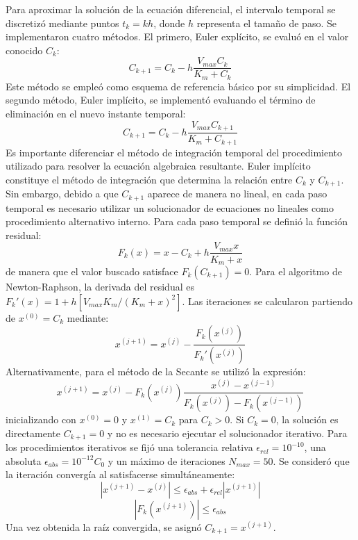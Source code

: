 \documentclass[11pt,final,5p,times,twocolumn,authoryear]{elsarticle}
\begin{document}
Para aproximar la solución de la ecuación diferencial, el intervalo temporal se discretizó mediante puntos $t_k = kh$, donde $h$ representa el tamaño de paso. Se implementaron cuatro métodos. El primero, Euler explícito, se evaluó en el valor conocido $C_k$:
\begin{equation}
C_{k+1} = C_{k} - h\frac{V_{max}C_k}{K_m+C_k}
\end{equation}
Este método se empleó como esquema de referencia básico por su simplicidad. El segundo método, Euler implícito, se implementó evaluando el término de eliminación en el nuevo instante temporal:
\begin{equation}
C_{k+1} = C_{k} - h\frac{V_{max}C_{k+1}}{K_m+C_{k+1}}
\end{equation}
Es importante diferenciar el método de integración temporal del procedimiento utilizado para resolver la ecuación algebraica resultante. Euler implícito constituye el método de integración que determina la relación entre $C_k$ y $C_{k+1}$. Sin embargo, debido a que $C_{k+1}$ aparece de manera no lineal, en cada paso temporal es necesario utilizar un solucionador de ecuaciones no lineales como procedimiento alternativo interno. Para cada paso temporal se definió la función residual:
\begin{equation}
F_k(x) = x - C_k + h\frac{V_{max}x}{K_m+x}
\end{equation}
de manera que el valor buscado satisface $F_k(C_{k+1}) = 0$. Para el algoritmo de Newton-Raphson, la derivada del residual es $F_k'(x) = 1 + h [V_{max}K_m / (K_m+x)^2]$. Las iteraciones se calcularon partiendo de $x^{(0)} = C_k$ mediante:
\begin{equation}
x^{(j+1)} = x^{(j)} - \frac{F_k(x^{(j)})}{F_k'(x^{(j)})}
\end{equation}
Alternativamente, para el método de la Secante se utilizó la expresión:
\begin{equation}
x^{(j+1)} = x^{(j)} - F_k(x^{(j)})\frac{x^{(j)} - x^{(j-1)}}{F_k(x^{(j)}) - F_k(x^{(j-1)})}
\end{equation}
inicializando con $x^{(0)} = 0$ y $x^{(1)} = C_k$ para $C_k > 0$. Si $C_k = 0$, la solución es directamente $C_{k+1} = 0$ y no es necesario ejecutar el solucionador iterativo. Para los procedimientos iterativos se fijó una tolerancia relativa $\epsilon_{rel} = 10^{-10}$, una absoluta $\epsilon_{abs} = 10^{-12}C_0$ y un máximo de iteraciones $N_{max} = 50$. Se consideró que la iteración convergía al satisfacerse simultáneamente:
\begin{equation}
|x^{(j+1)} - x^{(j)}| \le \epsilon_{abs} + \epsilon_{rel}|x^{(j+1)}|
\end{equation}
\begin{equation}
|F_k(x^{(j+1)})| \le \epsilon_{abs}
\end{equation}
Una vez obtenida la raíz convergida, se asignó $C_{k+1} = x^{(j+1)}$.
\end{document}

